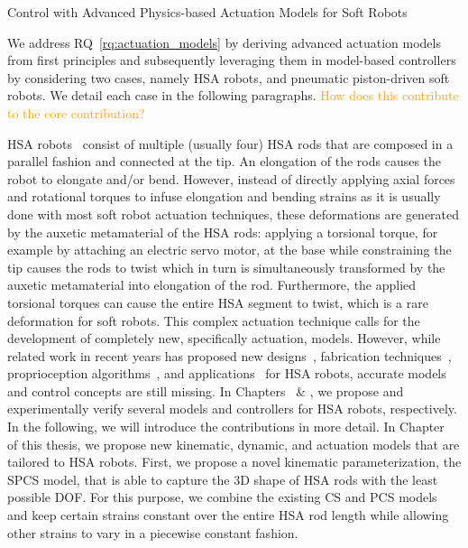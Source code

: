 \begin{contribution}\label{contrib:actuation_models}
    Control with Advanced Physics-based Actuation Models for Soft Robots
\end{contribution}
We address \gls{RQ}~\ref{rq:actuation_models} by deriving advanced actuation models from first principles and subsequently leveraging them in model-based controllers by considering two cases, namely \gls{HSA} robots, and pneumatic piston-driven soft robots. We detail each case in the following paragraphs.
\textcolor{orange}{How does this contribute to the core contribution?}

\gls{HSA} robots~\cite{lipton2018handedness, chin2018compliant} consist of multiple (usually four) \gls{HSA} rods that are composed in a parallel fashion and connected at the tip. An elongation of the rods causes the robot to elongate and/or bend. However, instead of directly applying axial forces and rotational torques to infuse elongation and bending strains as it is usually done with most soft robot actuation techniques, these deformations are generated by the auxetic metamaterial of the \gls{HSA} rods: applying a torsional torque, for example by attaching an electric servo motor, at the base while constraining the tip causes the rods to twist which in turn is simultaneously transformed by the auxetic metamaterial into elongation of the rod.
Furthermore, the applied torsional torques can cause the entire \gls{HSA} segment to twist, which is a rare deformation for soft robots.
This complex actuation technique calls for the development of completely new, specifically actuation, models. However, while related work in recent years has proposed new designs~\cite{good2022expanding, good2025torque}, fabrication techniques~\cite{truby2021recipe}, proprioception algorithms~\cite{zhang2022vision}, and applications~\cite{chen2024real} for \gls{HSA} robots, accurate models~\cite{garg2022kinematic} and control concepts are still missing. In Chapters~\circled{\ref{chp:hsamodel}} \& \circled{\ref{chp:hsacontrol}}, we propose and experimentally verify several models and controllers for \gls{HSA} robots, respectively. In the following, we will introduce the contributions in more detail.
In Chapter~\circled{\ref{chp:hsamodel}}  of this thesis, we propose new kinematic, dynamic, and actuation models that are tailored to \gls{HSA} robots.
First, we propose a novel kinematic parameterization, the \gls{SPCS} model, that is able to capture the 3D shape of \gls{HSA} rods with the least possible \gls{DOF}.
For this purpose, we combine the existing \gls{CS} and \gls{PCS} models~\cite{renda2018discrete} and keep certain strains constant over the entire \gls{HSA} rod length while allowing other strains to vary in a piecewise constant fashion.
